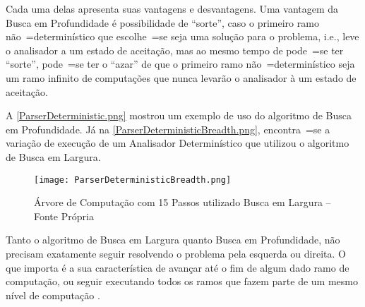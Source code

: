     Cada uma delas apresenta suas vantagens e
    desvantagens.
    Uma vantagem da Busca em Profundidade é possibilidade de ``sorte'',
    caso o primeiro ramo não~=determinístico que escolhe~=se seja uma solução para o problema,
    i.e.,
    leve o analisador a um estado de aceitação,
    mas ao mesmo tempo de pode~=se ter ``sorte'',
    pode~=se ter o ``azar'' de que o primeiro ramo não~=determinístico seja um ramo infinito de computações que nunca levarão o analisador à um estado de aceitação.

    A \autoref{ParserDeterministic.png} mostrou um exemplo de uso do algoritmo de Busca em Profundidade.
    Já na \autoref{ParserDeterministicBreadth.png},
    encontra~=se a variação de execução de um Analisador Determinístico que utilizou o algoritmo de Busca em Largura.
    \begin{figure}[h]
    \centering
    \texttt{[image: ParserDeterministicBreadth.png]}
    \caption[Árvore de Computação com 15 Passos utilizado Busca em Largura]{Árvore de Computação com 15 Passos utilizado Busca em Largura -- Fonte Própria}
    \label{ParserDeterministicBreadth.png}
    \end{figure}

    Tanto o algoritmo de Busca em Largura quanto Busca em Profundidade,
    não precisam exatamente seguir resolvendo o problema pela esquerda ou
    direita.
    O que importa é a sua característica de avançar até o fim de algum dado ramo de computação,
    ou seguir executando todos os ramos que fazem parte de um mesmo nível de computação \cite{cormenIntroductionToAlgorithms,efficientBreadthFirstSearch}.

